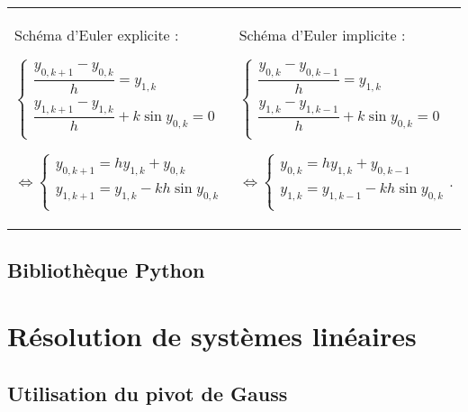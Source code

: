 {\begin{itemize}[label=,font=\color{red}]
\begin{center}
\begin{tabular}{p{.47\linewidth}|p{.47\linewidth}}
Schéma d'Euler explicite :   

$
\left\{
\begin{array}{l}
\dfrac{y_{0,k+1}-y_{0,k}}{h} = y_{1,k} \\
\dfrac{y_{1,k+1}-y_{1,k}}{h} + k \sin y_{0,k} = 0 \\
\end{array}
\right.$

$\Leftrightarrow 
\left\{
\begin{array}{l}
y_{0,k+1} = h y_{1,k} +y_{0,k} \\
y_{1,k+1} = y_{1,k} - kh \sin y_{0,k} \\
\end{array}
\right.$
&
Schéma d'Euler implicite : 

$
\left\{
\begin{array}{l}
\dfrac{y_{0,k}-y_{0,k-1}}{h} = y_{1,k} \\
\dfrac{y_{1,k}-y_{1,k-1}}{h} + k \sin y_{0,k} = 0 \\
\end{array}
\right.$

$\Leftrightarrow 
\left\{
\begin{array}{l}
y_{0,k} = h y_{1,k}+y_{0,k-1} \\
y_{1,k} = y_{1,k-1} - kh \sin y_{0,k} \\
\end{array}
\right.$.
\end{tabular}
\end{center}



\end{itemize}
\subsection{Bibliothèque Python}

\section{Résolution de systèmes linéaires}
\subsection{Utilisation du pivot de Gauss}

}
